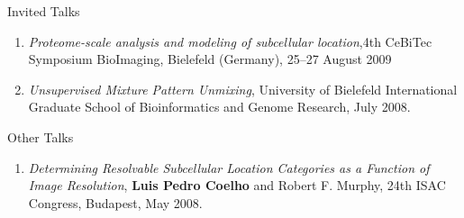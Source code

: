 \documentclass{article}
\renewcommand\subsection[1]{%
    \par\vspace{.1em}%
    {\hspace{1em}\subsubhead #1}%
    \par\vspace{.2em}%
}
\begin{document}
\subsection{Invited Talks}
\begin{enumerate}
\item \emph{Proteome-scale analysis and modeling of subcellular location},4th
CeBiTec Symposium BioImaging, Bielefeld (Germany), 25--27 August 2009
\item \emph{Unsupervised Mixture Pattern Unmixing}, University of Bielefeld
International Graduate School of Bioinformatics and Genome Research, July 2008.
\end{enumerate}


\subsection{Other Talks}

\begin{enumerate}
\item \emph{Determining Resolvable Subcellular Location Categories as a
Function of Image Resolution}, \textbf{Luis Pedro Coelho} and Robert F. Murphy,
24th ISAC Congress, Budapest, May 2008.
\end{enumerate}
\end{document}
